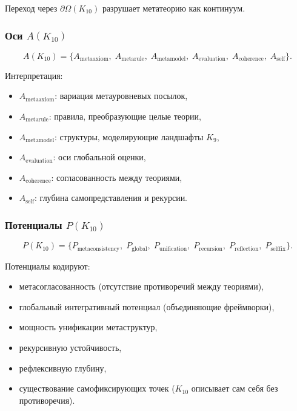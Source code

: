 Переход через $\partial\Omega(K_{10})$ разрушает метатеорию как континуум.

\subsubsection{Оси $A(K_{10})$}

\[
A(K_{10})=
\{
A_{\mathrm{metaaxiom}},\;
A_{\mathrm{metarule}},\;
A_{\mathrm{metamodel}},\;
A_{\mathrm{evaluation}},\;
A_{\mathrm{coherence}},\;
A_{\mathrm{self}}
\}.
\]

Интерпретация:
\begin{itemize}
    \item $A_{\mathrm{metaaxiom}}$: вариация метауровневых посылок,
    \item $A_{\mathrm{metarule}}$: правила, преобразующие целые теории,
    \item $A_{\mathrm{metamodel}}$: структуры, моделирующие ландшафты $K_9$,
    \item $A_{\mathrm{evaluation}}$: оси глобальной оценки,
    \item $A_{\mathrm{coherence}}$: согласованность между теориями,
    \item $A_{\mathrm{self}}$: глубина самопредставления и рекурсии.
\end{itemize}

\subsubsection{Потенциалы $P(K_{10})$}

\[
P(K_{10})=
\{
P_{\mathrm{metaconsistency}},\;
P_{\mathrm{global}},\;
P_{\mathrm{unification}},\;
P_{\mathrm{recursion}},\;
P_{\mathrm{reflection}},\;
P_{\mathrm{selffix}}
\}.
\]

Потенциалы кодируют:
\begin{itemize}
    \item метасогласованность (отсутствие противоречий между теориями),
    \item глобальный интегративный потенциал (объединяющие фреймворки),
    \item мощность унификации метаструктур,
    \item рекурсивную устойчивость,
    \item рефлексивную глубину,
    \item существование самофиксирующих точек ($K_{10}$ описывает сам себя без противоречия).
\end{itemize}


